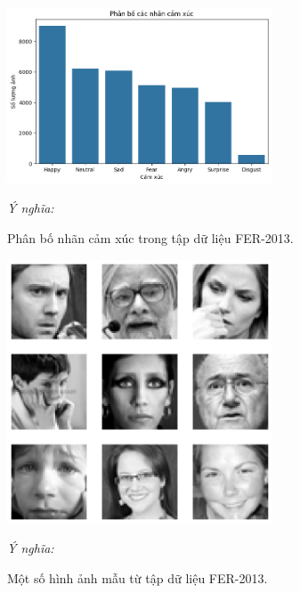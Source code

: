 \begin{figure}[H]
    \centering
    \includegraphics[width=0.7\textwidth]{img/phan_bo_nhan_cam_xuc.png} %
    \caption{Phân bố nhãn cảm xúc trong tập dữ liệu FER-2013.}
    \label{fig:emotion_distribution}
    \par\vspace{0.5cm} %
    \textit{Ý nghĩa:} 
\end{figure}

\begin{figure}[H]
    \centering
    \includegraphics[width=0.7\textwidth]{img/truc_quan_anh_mau.png} %
    \caption{Một số hình ảnh mẫu từ tập dữ liệu FER-2013.}
    \label{fig:sample_images}
    \par\vspace{0.5cm} %
    \textit{Ý nghĩa:} 
\end{figure}

